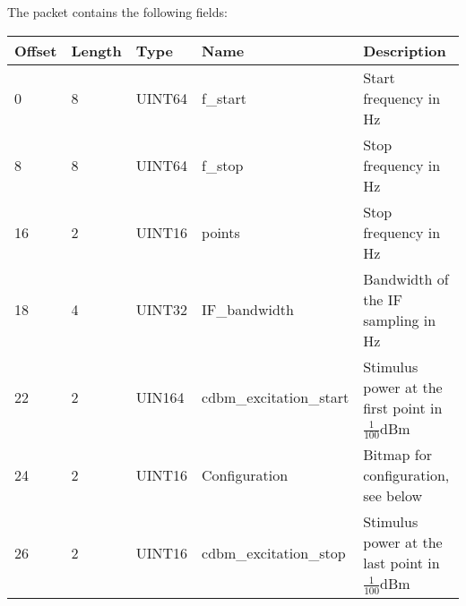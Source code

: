 \documentclass[a4paper,11pt]{article}
\begin{document}
The packet contains the following fields:
\begin{ThreePartTable}
\setlength\tabcolsep{3pt}

\begin{longtable}{p{} |  p{}  |  p{}| p{} | p{}}
\toprule
\textbf{Offset} &\textbf{Length} &\textbf{Type} & \textbf{Name} &\textbf{Description} \\ 
\hline
\endhead
\midrule[\heavyrulewidth]
\endfoot  
\midrule[\heavyrulewidth]
\endlastfoot

0 & 8 & UINT64 & f\_start & Start frequency in Hz \\
8 & 8 & UINT64 & f\_stop & Stop frequency in Hz \\
16 & 2 & UINT16 & points & Stop frequency in Hz \\
18 & 4 & UINT32 & IF\_bandwidth & Bandwidth of the IF sampling in Hz \\
22 & 2 &  UIN164 &cdbm\_excitation\_start &  Stimulus power at the first point in $\frac{1}{100}$dBm \\
24 & 2 & UINT16 & Configuration & Bitmap for configuration, see below \\
26 & 2 &  UINT16 &cdbm\_excitation\_stop & Stimulus power at the last point in $\frac{1}{100}$dBm \\
\end{longtable}   
\end{ThreePartTable}
\end{document}
